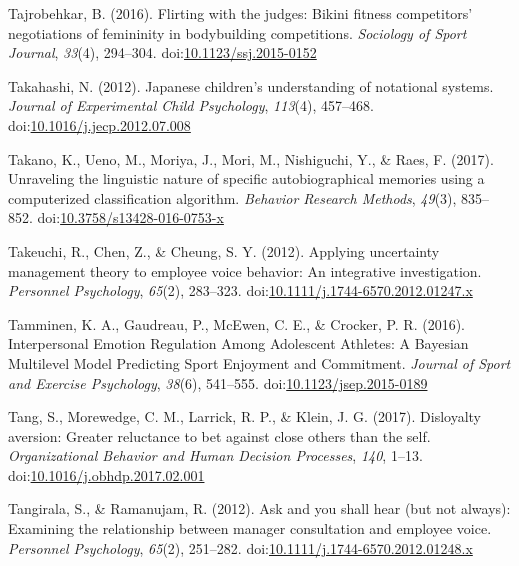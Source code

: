 \documentclass[english,man]{apa6}
\theoremstyle{definition}
\theoremstyle{definition}
\theoremstyle{definition}
\theoremstyle{remark}
\begin{document}
\hypertarget{ref-Tajrobehkar2016}{}
Tajrobehkar, B. (2016). Flirting with the judges: Bikini fitness
competitors' negotiations of femininity in bodybuilding competitions.
\emph{Sociology of Sport Journal}, \emph{33}(4), 294--304.
doi:\href{https://doi.org/10.1123/ssj.2015-0152}{10.1123/ssj.2015-0152}

\hypertarget{ref-Takahashi2012}{}
Takahashi, N. (2012). Japanese children's understanding of notational
systems. \emph{Journal of Experimental Child Psychology}, \emph{113}(4),
457--468.
doi:\href{https://doi.org/10.1016/j.jecp.2012.07.008}{10.1016/j.jecp.2012.07.008}

\hypertarget{ref-Takano2017}{}
Takano, K., Ueno, M., Moriya, J., Mori, M., Nishiguchi, Y., \& Raes, F.
(2017). Unraveling the linguistic nature of specific autobiographical
memories using a computerized classification algorithm. \emph{Behavior
Research Methods}, \emph{49}(3), 835--852.
doi:\href{https://doi.org/10.3758/s13428-016-0753-x}{10.3758/s13428-016-0753-x}

\hypertarget{ref-Takeuchi2012}{}
Takeuchi, R., Chen, Z., \& Cheung, S. Y. (2012). Applying uncertainty
management theory to employee voice behavior: An integrative
investigation. \emph{Personnel Psychology}, \emph{65}(2), 283--323.
doi:\href{https://doi.org/10.1111/j.1744-6570.2012.01247.x}{10.1111/j.1744-6570.2012.01247.x}

\hypertarget{ref-Tamminen2016}{}
Tamminen, K. A., Gaudreau, P., McEwen, C. E., \& Crocker, P. R. (2016).
Interpersonal Emotion Regulation Among Adolescent Athletes: A Bayesian
Multilevel Model Predicting Sport Enjoyment and Commitment.
\emph{Journal of Sport and Exercise Psychology}, \emph{38}(6), 541--555.
doi:\href{https://doi.org/10.1123/jsep.2015-0189}{10.1123/jsep.2015-0189}

\hypertarget{ref-Tang2017}{}
Tang, S., Morewedge, C. M., Larrick, R. P., \& Klein, J. G. (2017).
Disloyalty aversion: Greater reluctance to bet against close others than
the self. \emph{Organizational Behavior and Human Decision Processes},
\emph{140}, 1--13.
doi:\href{https://doi.org/10.1016/j.obhdp.2017.02.001}{10.1016/j.obhdp.2017.02.001}

\hypertarget{ref-Tangirala2012}{}
Tangirala, S., \& Ramanujam, R. (2012). Ask and you shall hear (but not
always): Examining the relationship between manager consultation and
employee voice. \emph{Personnel Psychology}, \emph{65}(2), 251--282.
doi:\href{https://doi.org/10.1111/j.1744-6570.2012.01248.x}{10.1111/j.1744-6570.2012.01248.x}
\end{document}
